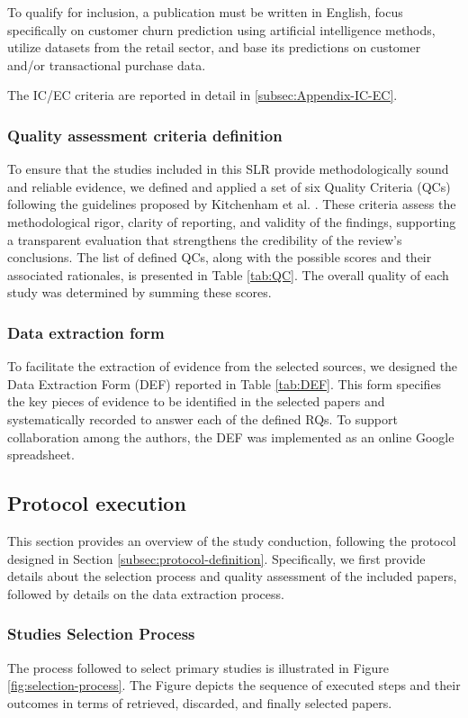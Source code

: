 \documentclass[preprint,12pt]{elsarticle}
\begin{document}
To qualify for inclusion, a publication must be written in English, focus specifically on customer churn prediction using artificial intelligence methods, utilize datasets from the retail sector, and base its predictions on customer and/or transactional purchase data.

The IC/EC criteria are reported in detail in \ref{subsec:Appendix-IC-EC}.


\subsubsection{Quality assessment criteria definition}
To ensure that the studies included in this SLR provide methodologically sound and reliable evidence, we defined and applied a set of six Quality Criteria (QCs) following the guidelines proposed by Kitchenham et al. \cite{SEGRESS_Kitchenham_2023}. These criteria assess the methodological rigor, clarity of reporting, and validity of the findings, supporting a transparent evaluation that strengthens the credibility of the review’s conclusions.
The list of defined QCs, along with the possible scores and their associated rationales, is presented in Table \ref{tab:QC}. The overall quality of each study was determined by summing these scores. 



\subsubsection{Data extraction form}\nopagebreak
To facilitate the extraction of evidence from the selected sources, we designed the Data Extraction Form (DEF) reported in Table \ref{tab:DEF}. This form specifies the key pieces of evidence to be identified in the selected papers and systematically recorded to answer each of the defined RQs. To support collaboration among the authors, the DEF was implemented as an online Google spreadsheet.



\subsection{Protocol execution}
\label{subsec:protocol-execution}
This section provides an overview of the study conduction, following the protocol designed in Section \ref{subsec:protocol-definition}. Specifically, we first provide details about
the selection process and quality assessment of the included papers, followed by details on the data extraction process.


\subsubsection{Studies Selection Process} 
The process followed to select primary studies is illustrated in Figure \ref{fig:selection-process}. The Figure depicts the sequence of executed steps and their outcomes in terms of retrieved, discarded, and finally selected papers. 
\end{document}
